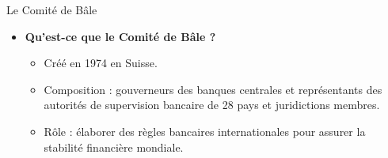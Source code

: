 \begin{frame}{Le Comité de Bâle}
    \begin{itemize}
        \item \textbf{Qu'est-ce que le Comité de Bâle ?}
            \begin{itemize}
                \item Créé en 1974 en Suisse.
                \item Composition : gouverneurs des banques centrales et représentants des autorités de supervision bancaire de 28 pays et juridictions membres.
                \item Rôle : élaborer des règles bancaires internationales pour assurer la stabilité financière mondiale.
            \end{itemize}
    \end{itemize}
\end{frame}